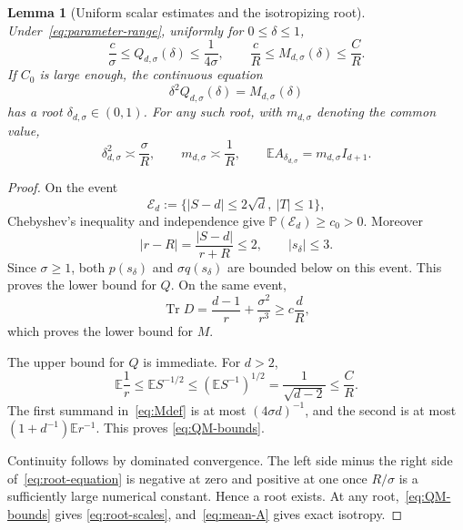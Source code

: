 \documentclass[11pt]{article}
\numberwithin{equation}{section}
\newtheorem{lemma}[theorem]{Lemma}
\DeclareMathOperator{\Tr}{Tr}
\newcommand{\E}{\mathbb E}
\begin{document}
\begin{lemma}[Uniform scalar estimates and the isotropizing root]
\label{lem:isotropization}
Under~\eqref{eq:parameter-range}, uniformly for $0\le\delta\le1$,
\begin{equation}\label{eq:QM-bounds}
 \frac c\sigma\le Q_{d,\sigma}(\delta)\le\frac1{4\sigma},
 \qquad
 \frac cR\le M_{d,\sigma}(\delta)\le\frac CR.
\end{equation}
If $C_0$ is large enough, the continuous equation
\begin{equation}\label{eq:root-equation}
 \delta^2Q_{d,\sigma}(\delta)=M_{d,\sigma}(\delta)
\end{equation}
has a root $\delta_{d,\sigma}\in(0,1)$.  For any such root, with
$m_{d,\sigma}$ denoting the common value,
\begin{equation}\label{eq:root-scales}
 \delta_{d,\sigma}^2\asymp\frac\sigma R,\qquad
 m_{d,\sigma}\asymp\frac1R,\qquad
 \E A_{\delta_{d,\sigma}}=m_{d,\sigma}I_{d+1}.
\end{equation}
\end{lemma}

\begin{proof}
On the event
\[
 \mathcal E_d:=\{|S-d|\le2\sqrt d,\ |T|\le1\},
\]
Chebyshev's inequality and independence give
$\mathbb P(\mathcal E_d)\ge c_0>0$.  Moreover
\[
 |r-R|=\frac{|S-d|}{r+R}\le2,\qquad |s_\delta|\le3.
\]
Since $\sigma\ge1$, both $p(s_\delta)$ and
$\sigma q(s_\delta)$ are bounded below on this event.  This proves the
lower bound for $Q$.  On the same event,
\[
 \Tr D=\frac{d-1}{r}+\frac{\sigma^2}{r^3}\ge c\frac dR,
\]
which proves the lower bound for $M$.

The upper bound for $Q$ is immediate.  For $d>2$,
\begin{equation}\label{eq:inverse-radius}
 \E\frac1r\le\E S^{-1/2}
 \le(\E S^{-1})^{1/2}=\frac1{\sqrt{d-2}}\le\frac CR.
\end{equation}
The first summand in~\eqref{eq:Mdef} is at most $(4\sigma d)^{-1}$,
and the second is at most $(1+d^{-1})\E r^{-1}$.  This proves
\eqref{eq:QM-bounds}.

Continuity follows by dominated convergence.  The left side minus the right
side of~\eqref{eq:root-equation} is negative at zero and positive at one
once $R/\sigma$ is a sufficiently large numerical constant.  Hence a root
exists.  At any root,~\eqref{eq:QM-bounds} gives
\eqref{eq:root-scales}, and~\eqref{eq:mean-A} gives exact isotropy.
\end{proof}
\end{document}

